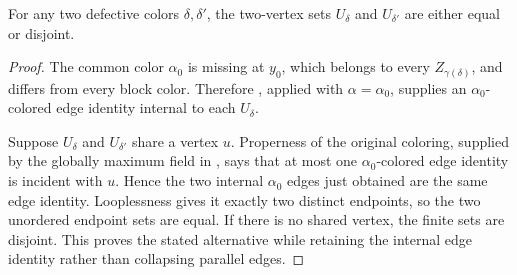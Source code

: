 \begin{lemma}
For any two defective colors $\delta,\delta'$, the two-vertex sets
$U_\delta$ and $U_{\delta'}$ are either equal or disjoint.
\end{lemma}
\begin{proof}
The common color $\alpha_0$ is missing at $y_0$, which belongs to every
$Z_{\gamma(\delta)}$, and differs from every block color.  Therefore
, applied with
$\alpha=\alpha_0$, supplies an $\alpha_0$-colored edge identity internal
to each $U_\delta$.

Suppose $U_\delta$ and $U_{\delta'}$ share a vertex $u$.  Properness of the
original coloring, supplied by the globally maximum field in
, says that at most one
$\alpha_0$-colored edge identity is incident with $u$.  Hence the two
internal $\alpha_0$ edges just obtained are the same edge identity.
Looplessness gives it exactly two distinct endpoints, so the two unordered
endpoint sets are equal.  If there is no shared vertex, the finite sets are
disjoint.  This proves the stated alternative while retaining the internal
edge identity rather than collapsing parallel edges.
\end{proof}
